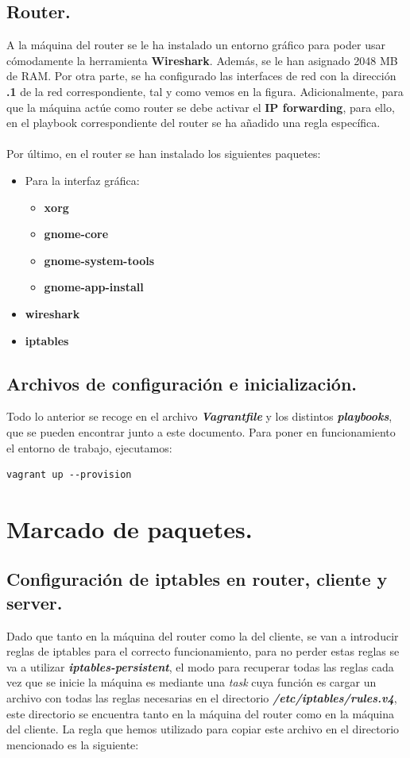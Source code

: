 \documentclass[11pt]{article}
\begin{document}
\subsection{Router.}
A la máquina del router se le ha instalado un entorno gráfico para poder usar cómodamente la herramienta \textbf{Wireshark}. Además, se le han asignado 2048 MB de RAM. Por otra parte, se ha configurado las interfaces de red con la dirección \textbf{.1} de la red correspondiente, tal y como vemos en la figura. Adicionalmente, para que la máquina actúe como router se debe activar el \textbf{IP forwarding}, para ello, en el playbook correspondiente del router se ha añadido una regla específica. \\ \\
Por último, en el router se han instalado los siguientes paquetes:
\begin{itemize}
\item Para la interfaz gráfica:
	\begin{itemize}
		\item \textbf{xorg}
		\item \textbf{gnome-core}
		\item \textbf{gnome-system-tools}
		\item \textbf{gnome-app-install}
	\end{itemize}
\item \textbf{wireshark}
\item \textbf{iptables}			
\end{itemize}

\subsection{Archivos de configuración e inicialización.}
Todo lo anterior se recoge en el archivo \textbf{\textit{Vagrantfile}} y los distintos \textbf{\textit{playbooks}}, que se pueden encontrar junto a este documento. Para poner en funcionamiento el entorno de trabajo, ejecutamos:
\begin{lstlisting}[style=C,numbers=none]
	vagrant up --provision
\end{lstlisting}

\section{Marcado de paquetes.}
\subsection{Configuración de iptables en router, cliente y server.}
Dado que tanto en la máquina del router como la del cliente, se van a introducir reglas de iptables para el correcto funcionamiento, para no perder estas reglas se va a utilizar \textbf{\textit{iptables-persistent}}, el modo para recuperar todas las reglas cada vez que se inicie la máquina es mediante una \textit{task} cuya función es cargar un archivo con todas las reglas necesarias en el directorio \textbf{\textit{/etc/iptables/rules.v4}}, este directorio se encuentra tanto en la máquina del router como en la máquina del cliente. La regla que hemos utilizado para copiar este archivo en el directorio mencionado es la siguiente:
\end{document}
